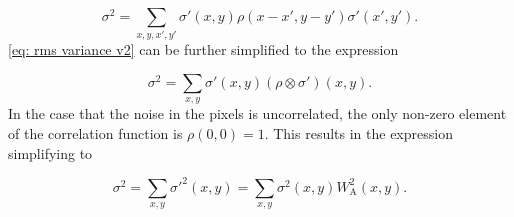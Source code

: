 \begin{equation}\label{eq: rms variance v2}
    \sigma^2=\sum_{x,y,x',y'}\sigma'(x,y)\rho(x-x',y-y')\sigma'(x',y').
\end{equation}
\autoref{eq: rms variance v2} can be further simplified to the expression

\begin{equation}\label{eq: variance rms correlated}
    \sigma^2=\sum_{x,y}\sigma'(x,y)(\rho\otimes \sigma')(x,y).
\end{equation}
In the case that the noise in the pixels is uncorrelated, the only non-zero element of the correlation function is $\rho(0,0)=1$. This results in the expression simplifying to

\begin{equation}\label{eq: variance rms uncorrelated}
    \sigma^2=\sum_{x,y}\sigma'^2(x,y) =\sum_{x,y}\sigma^2(x,y)W_\mathrm{A}^2(x,y).
\end{equation}



